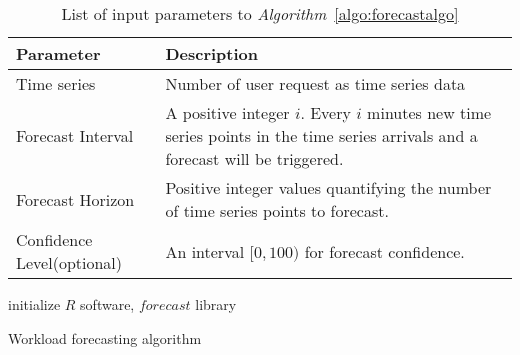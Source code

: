 \begin{flushleft}
  \begin{table}
    \begin{tabular}{ | L{5cm} | L{5cm} |}
      \hline
      Parameter & Description \\ \hline
      Time series & Number of user request as time series data \\ \hline
      Forecast Interval & A positive integer \(i\). Every \(i\) minutes new time series points in the time series arrivals and a forecast will be triggered. \\ \hline
      Forecast Horizon & Positive integer values quantifying the number of time series points to forecast.  \\ \hline
      Confidence Level(optional)  & An interval \([0,100)\) for forecast confidence.\\ \hline
    \end{tabular}
    \caption{List of input parameters to \textit{Algorithm}~\ref{algo:forecastalgo}}
     \label{table:forecastparameter}
\end{table}
\end{flushleft}

\LinesNumbered
\begin{algorithm}[H]
 initialize \(R\) software, \(forecast\) library \;
  \caption{Workload forecasting algorithm}
  \label{algo:forecastalgo}
 \end{algorithm}

